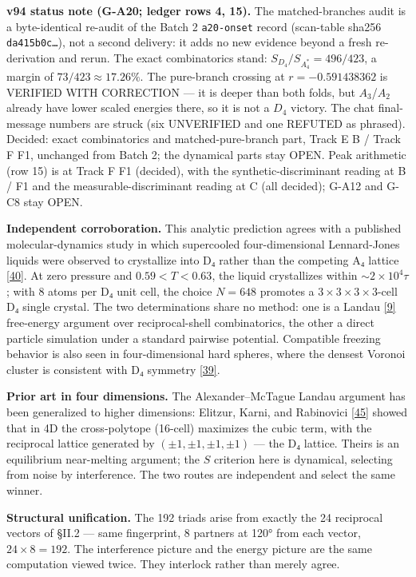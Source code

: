 \documentclass[a4paper,11pt]{article}
\begin{document}
\textbf{v94 status note (G-A20; ledger rows 4, 15).} The matched-branches audit is a byte-identical re-audit of the Batch 2 \texttt{a20-onset} record (scan-table sha256 \texttt{da415b0c\ldots}), not a second delivery: it adds no new evidence beyond a fresh re-derivation and rerun. The exact combinatorics stand: $S_{D_4}/S_{A_4^*}=496/423$, a margin of $73/423\approx17.26\%$. The pure-branch crossing at $r=-0.591438362$ is VERIFIED WITH CORRECTION --- it is deeper than both folds, but $A_3$/$A_2$ already have lower scaled energies there, so it is not a $D_4$ victory. The chat final-message numbers are struck (six UNVERIFIED and one REFUTED as phrased). Decided: exact combinatorics and matched-pure-branch part, Track E B / Track F F1, unchanged from Batch 2; the dynamical parts stay OPEN. Peak arithmetic (row 15) is at Track F F1 (decided), with the synthetic-discriminant reading at B / F1 and the measurable-discriminant reading at C (all decided); G-A12 and G-C8 stay OPEN.

\textbf{Independent corroboration.} This analytic prediction agrees with a published molecular-dynamics study in which supercooled four-dimensional Lennard-Jones liquids were observed to crystallize into D₄ rather than the competing A₄ lattice \hyperref[ref40]{[40]}. At zero pressure and $0.59<T<0.63$, the liquid crystallizes within ${\sim}2\times10^4\tau$; with 8 atoms per D₄ unit cell, the choice $N=648$ promotes a $3\times3\times3\times3$-cell D₄ single crystal. The two determinations share no method: one is a Landau \hyperref[ref9]{[9]} free-energy argument over reciprocal-shell combinatorics, the other a direct particle simulation under a standard pairwise potential. Compatible freezing behavior is also seen in four-dimensional hard spheres, where the densest Voronoi cluster is consistent with D₄ symmetry \hyperref[ref39]{[39]}.

\textbf{Prior art in four dimensions.} The Alexander–McTague Landau argument has been generalized to higher dimensions: Elitzur, Karni, and Rabinovici \hyperref[ref45]{[45]} showed that in 4D the cross-polytope (16-cell) maximizes the cubic term, with the reciprocal lattice generated by $(\pm1,\pm1,\pm1,\pm1)$ — the D₄ lattice. Theirs is an equilibrium near-melting argument; the $S$ criterion here is dynamical, selecting from noise by interference. The two routes are independent and select the same winner.

\textbf{Structural unification.} The 192 triads arise from exactly the 24 reciprocal vectors of §II.2 — same fingerprint, 8 partners at 120° from each vector, $24\times8=192$. The interference picture and the energy picture are the same computation viewed twice. They interlock rather than merely agree.
\end{document}
